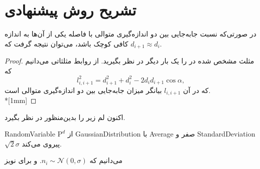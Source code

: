\section{تشریح روش پیشنهادی}
\label{sec:proposedapproach}
\begin{nttheorem}
	\label{theorem:betweenmeasure}
	در صورتی‌که نسبت جابه‌جایی بین دو اندازه‌گیری متوالی با فاصله یکی از آن‌ها به اندازه کافی کوچک باشد، می‌توان نتیجه گرفت که 
	$d_{i+1} \approx d_i$.
\end{nttheorem}
\begin{proof}
	مثلث مشخص شده در 
	را یک بار دیگر در نظر بگیرید. از روابط مثلثاتی می‌دانیم که 
	\begin{equation}
		l_{i,i+1}^2 = d_{i+1}^2+d_i^2 - 2d_id_{i+1}\cos\alpha,
		\label{eq:liiid}
	\end{equation}
	که در آن $l_{i,i+1}$ بیانگر میزان جابه‌جایی بین دو اندازه‌گیری متوالی است.
	\\*[1mm]
\end{proof}

اکنون لم زیر را بدین‌منظور در نظر بگیرد.
\begin{lemma}
	\gls{RandomVariable} $\mathrm{P}^d$
	از
	\gls{GaussianDistribution}
	با 
	\gls{Average}  صفر و \gls{StandardDeviation} $\sqrt{2}\sigma$
	پیروی می‌کند. 
\end{lemma}
\begin{lemmaproof}
	می‌دانیم که 
	$n_i\sim\mathcal{N}(0,\sigma)$. 
	و برای نویز

	
	
\end{lemmaproof}


